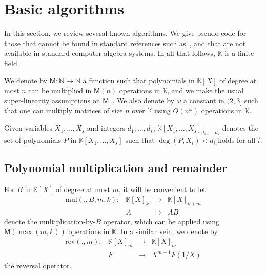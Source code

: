 \documentclass[12pt]{article}
\def\M {\ensuremath{\mathsf{M}}}
\def\N {\ensuremath{\mathbb{N}}}
\def\K {\ensuremath{\mathbb{K}}}
\def\mul {\ensuremath{\mathrm{mul}}}
\def\rev {\ensuremath{\mathrm{rev}}}
\begin{document}

\section{Basic algorithms}

In this section, we review several known algorithms. We give
pseudo-code for those that cannot be found in standard references such
as~\cite{vzGG}, and that are not available in standard computer
algebra systems. In all that follows, $\K$ is a finite field.

We denote by $\M:\N \to \N$ a function such that polynomials in
$\K[X]$ of degree at most $n$ can be multiplied in $\M(n)$ operations
in $\K$, and we make the usual super-linearity assumptions on
$\M$~\cite[Chapter~8]{vzGG}. We also denote by $\omega$ a constant in
$(2,3]$ such that one can multiply matrices of size $n$ over $\K$
using $O(n^\omega)$ operations in $\K$.

Given variables $X_1,\dots,X_s$ and integers $d_1,\dots,d_s$,
$\K[X_1,\dots,X_s]_{d_1,\dots,d_s}$ denotes the set of polynomials $P$
in $\K[X_1,\dots,X_s]$ such that $\deg(P,X_i) < d_i$ holds for all
$i$.


\subsection{Polynomial multiplication and remainder}

For $B$ in $\K[X]$ of degree at most $m$, it will be convenient to let
$$
\begin{array}{cccc}
\mul(.,B,m,k): &\K[X]_k& \to &\K[X]_{k+m}\\
& A & \mapsto & AB
\end{array}$$ 
denote the multiplication-by-$B$ operator, which can be applied using
$\M(\max(m,k))$ operations in $\K$. In a similar vein, we denote by
$$
\begin{array}{cccc}
\rev(.,m): &\K[X]_m &\to& \K[X]_m  \\
& F & \mapsto & X^{m-1} F(1/X)
\end{array}$$ the reversal operator. 
\end{document}
